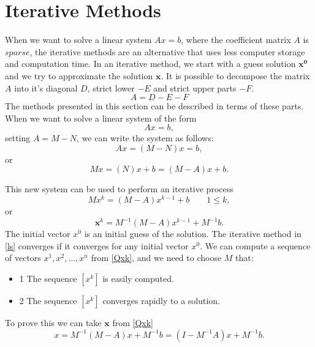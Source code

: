 \documentclass[12pt]{report}
\begin{document}
\section{Iterative Methods}
When we want to solve a linear system $Ax=b$, where the coefficient matrix $A$ is $sparse$,
the iterative methods are an alternative that uses less computer storage and computation time.
In an iterative method, we start with a guess solution $\mathbf{x^0}$ and we try to approximate
the solution $\mathbf{x}$.
It is possible to decompose the matrix $A$ into it's diagonal $D$, strict lower $-E$ and strict
upper parts $-F$. 
$$A=D-E-F$$
The methods presented in this section can be described in terms of these parts.
When we want to solve a linear system of the form $$Ax=b,$$ setting $A=M-N$, we can write the system as follows:
\begin{equation*}
Ax=(M-N)x=b,
\end{equation*}
or
\begin{equation*}
Mx=(N)x+b=(M-A)x+b.
\end{equation*}

This new system can be used to perform an iterative process
\begin{equation*}
Mx^{k}=(M-A)x^{k-1}+b \qquad 1\leq k, 
\end{equation*}
or
\begin{equation}
\mathbf{x}^{k}=M^{-1}(M-A)x^{k-1}+M^{-1}b. \label{Qxk}
\end{equation}
The initial vector $x^{0}$ is an initial guess of the solution. The iterative method in \eqref{ls}
converges if it converges for any initial vector $x^{0}$. We can compute a sequence of vectors $x^{1},x^{2},\dots,x^{n}$  
 from \eqref{Qxk}, and we need to choose $M$ that:
\begin{itemize}
\item{1} The sequence $[x^{k}]$ is easily computed.
\item{2} The sequence $[x^{k}]$ converges rapidly to a solution.
\end{itemize}
To prove this we can take $\mathbf{x}$ from \eqref{Qxk}
\begin{equation*}
x=M^{-1}(M-A)x+M^{-1}b=(I-M^{-1}A)x+M^{-1}b.
\end{equation*}
\end{document}
